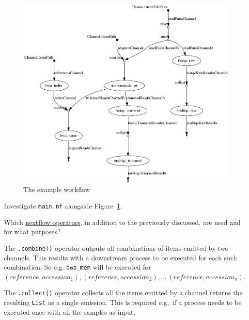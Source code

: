 \begin{figure}[H]
\centering
\includegraphics[width=\textwidth]{handout/flowchart.png}
\caption{The example workflow}
\label{fig:dag}
\end{figure}


\begin{questions}
Investigate \texttt{main.nf} alongside Figure~\ref{fig:dag}. 

Which \href{https://www.nextflow.io/docs/latest/operator.html}{nextflow operators}, in addition to the previously discussed, are used and for what purposes? 

\begin{answer}
The \texttt{.combine()} operator outputs all combinations of items emitted by two channels. This results with a downstream process to be executed for each such combination. So e.g. \texttt{bwa\_mem} will be executed for\\ $(reference, accession_1),(reference, accession_2),..,(reference, accession_n)$.

The \texttt{.collect()} operator collects all the items emitted by a channel returns the resulting \texttt{List} as a single emission. This is required e.g.\ if a process needs to be executed once with all the samples as input.
\end{answer}

\end{questions}


%
%
%


